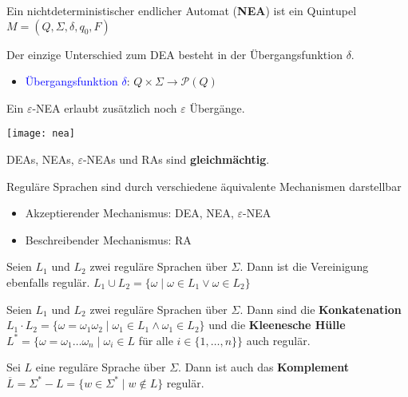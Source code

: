 
Ein nichtdeterministischer endlicher Automat (\textbf{NEA}) ist ein Quintupel \\ $M = (Q, \Sigma, \delta, q_0, F)$

Der einzige Unterschied zum DEA besteht in der Übergangsfunktion $\delta$.
\begin{itemize}
    \item \textcolor{blue}{Übergangsfunktion $\delta$}: $Q \times \Sigma \rightarrow \mathcal{P}(Q)$
\end{itemize}
Ein $\varepsilon$-NEA erlaubt zusätzlich noch $\varepsilon$ Übergänge.

\texttt{[image: nea]}

DEAs, NEAs, $\varepsilon$-NEAs und RAs sind \textbf{gleichmächtig}.

\columnbreak


Reguläre Sprachen sind durch verschiedene äquivalente Mechanismen darstellbar
\begin{itemize}
    \item Akzeptierender Mechanismus: DEA, NEA, $\varepsilon$-NEA
    \item Beschreibender Mechanismus: RA
\end{itemize}

Seien $L_1$ und $L_2$ zwei reguläre Sprachen über $\Sigma$.
Dann ist die Vereinigung ebenfalls regulär.
$L_1 \cup L_2 = \{\omega \mid \omega \in L_1 \lor \omega \in L_2\}$

Seien $L_1$ und $L_2$ zwei reguläre Sprachen über $\Sigma$.
Dann sind die \textbf{Konkatenation} $L_1 \cdot L_2 = \{ \omega = \omega_1 \omega_2 \mid \omega_1 \in L_1 \land \omega_1 \in L_2 \}$ und die \textbf{Kleenesche Hülle} \\ $L^* = \{ \omega = \omega_1 \dots \omega_n \mid \omega_i \in L$ für alle $i \in \{1, \dots, n\} \}$ auch regulär.

Sei $L$ eine reguläre Sprache über $\Sigma$.
Dann ist auch das \textbf{Komplement} $\overline{L} = \Sigma^* - L = \{ w \in \Sigma^* \mid w \notin L \}$ regulär.

